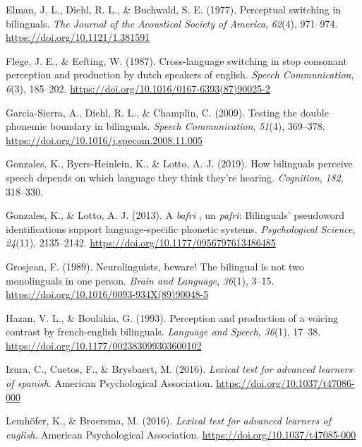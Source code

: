 \documentclass[
  man,floatsintext]{apa6}
\newlength{\cslhangindent}
\newlength{\cslentryspacingunit} %
\newenvironment{CSLReferences}[2] %
 {%
  \setlength{\parindent}{0pt}
  \ifodd #1
  \let\oldpar\par
  \def\par{\hangindent=\cslhangindent\oldpar}
  \fi
  \setlength{\parskip}{#2\cslentryspacingunit}
 }%
 {}
\begin{document}
\begin{CSLReferences}{1}{0}
\leavevmode{}%
Elman, J. L., Diehl, R. L., \& Buchwald, S. E. (1977). Perceptual switching in bilinguals. \emph{The Journal of the Acoustical Society of America}, \emph{62}(4), 971--974. \url{https://doi.org/10.1121/1.381591}

\leavevmode{}%
Flege, J. E., \& Eefting, W. (1987). Cross-language switching in stop consonant perception and production by dutch speakers of english. \emph{Speech Communication}, \emph{6}(3), 185--202. \url{https://doi.org/10.1016/0167-6393(87)90025-2}

\leavevmode{}%
Garcia-Sierra, A., Diehl, R. L., \& Champlin, C. (2009). Testing the double phonemic boundary in bilinguals. \emph{Speech Communication}, \emph{51}(4), 369--378. \url{https://doi.org/10.1016/j.specom.2008.11.005}

\leavevmode{}%
Gonzales, K., Byers-Heinlein, K., \& Lotto, A. J. (2019). How bilinguals perceive speech depends on which language they think they're hearing. \emph{Cognition}, \emph{182}, 318--330.

\leavevmode{}%
Gonzales, K., \& Lotto, A. J. (2013). A \emph{bafri} , un \emph{pafri}: Bilinguals' pseudoword identifications support language-specific phonetic systems. \emph{Psychological Science}, \emph{24}(11), 2135--2142. \url{https://doi.org/10.1177/0956797613486485}

\leavevmode{}%
Grosjean, F. (1989). Neurolinguists, beware! The bilingual is not two monolinguals in one person. \emph{Brain and Language}, \emph{36}(1), 3--15. \url{https://doi.org/10.1016/0093-934X(89)90048-5}

\leavevmode{}%
Hazan, V. L., \& Boulakia, G. (1993). Perception and production of a voicing contrast by french-english bilinguals. \emph{Language and Speech}, \emph{36}(1), 17--38. \url{https://doi.org/10.1177/002383099303600102}

\leavevmode{}%
Izura, C., Cuetos, F., \& Brysbaert, M. (2016). \emph{Lexical test for advanced learners of spanish}. American Psychological Association. \url{https://doi.org/10.1037/t47086-000}

\leavevmode{}%
Lemhöfer, K., \& Broersma, M. (2016). \emph{Lexical test for advanced learners of english}. American Psychological Association. \url{https://doi.org/10.1037/t47085-000}


\end{CSLReferences}
\end{document}
